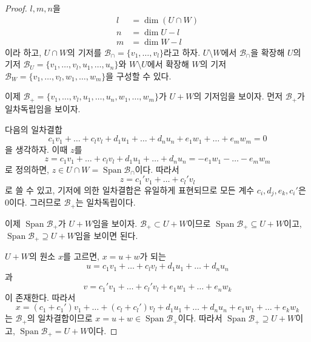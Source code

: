 \documentclass[unfonts,oneside,a4paper]{oblivoir}
\theoremstyle{definition}
\theoremstyle{theorem}
\theoremstyle{theorem}
\theoremstyle{remark}
\theoremstyle{remark}
\theoremstyle{remark}
\theoremstyle{remark}
\renewcommand{\vec}[1]{\bm{\mathit{#1}}}
\newcommand{\vecz}{\bm{\mathrm{0}}}
\DeclareMathOperator{\Span}{Span}
\begin{document}
\begin{proof}
    $l, m, n$을
    \begin{align*}
        l &= \dim (U \cap W)\\
        n &= \dim U - l\\
        m &= \dim W - l
    \end{align*}
    이라 하고, $U \cap W$의 기저를 $\mathcal B_\cap = \{\vec v_1, \dots, \vec v_l\}$라고 하자.
    $U \setminus W$에서 $\mathcal B_\cap$을 확장해 $U$의 기저 $\mathcal B_U = \{\vec v_1, \dots, \vec v_l, \vec u_1, \dots, \vec u_n\}$와 $W \setminus U$에서 확장해 $W$의 기저 $\mathcal B_W = \{\vec v_1, \dots, \vec v_l, \vec w_1, \dots, \vec w_m\}$을 구성할 수 있다.

    이제 $\mathcal B_+ = \{\vec v_1, \dots, \vec v_l, \vec u_1, \dots, \vec u_n, \vec w_1, \dots, \vec w_m\}$가 $U + W$의 기저임을 보이자.
    먼저 $\mathcal B_+$가 일차독립임을 보이자.
    
    다음의 일차결합
    \begin{equation*}
        c_1 \vec v_1 + \dots + c_l \vec v_l + d_1 \vec u_1 + \dots + d_n \vec u_n + e_1 \vec w_1 + \dots + e_m \vec w_m = \vecz
    \end{equation*}
    을 생각하자.
    이때 $\vec z$를
    \begin{equation*}
        \vec z = c_1 \vec v_1 + \dots + c_l \vec v_l + d_1 \vec u_1 + \dots + d_n \vec u_n = - e_1 \vec w_1 - \dots - e_m \vec w_m
    \end{equation*}
    로 정의하면, $\vec z \in U \cap W = \Span \mathcal B_\cap$이다.
    따라서
    \begin{equation*}
        \vec z = c_1' \vec v_1 + \dots + c_l' \vec v_l
    \end{equation*}
    로 쓸 수 있고, 기저에 의한 일차결합은 유일하게 표현되므로 모든 계수 $c_i, d_j, e_k, c_i'$은 0이다.
    그러므로 $\mathcal B_+$는 일차독립이다.
    
    이제 $\Span \mathcal B_+$가 $U + W$임을 보이자.
    $\mathcal B_+ \subset U + W$이므로 $\Span \mathcal B_+ \subseteq U + W$이고, $\Span \mathcal B_+ \supseteq U + W$임을 보이면 된다.
    
    $U + W$의 원소 $\vec x$를 고르면, $\vec x = \vec u + \vec w$가 되는
    \begin{equation*}
        \vec u = c_1 \vec v_1 + \dots + c_l \vec v_l + d_1 \vec u_1 + \dots + d_n \vec u_n
    \end{equation*}
    과
    \begin{equation*}
        \vec v = c_1' \vec v_1 + \dots + c_l' \vec v_l + e_1 \vec w_1 + \dots + e_n \vec w_k
    \end{equation*}
    이 존재한다.
    따라서
    \begin{equation*}
        \vec x = (c_1 + c_1') \vec v_1 + \dots + (c_l + c_l') \vec v_l + d_1 \vec u_1 + \dots + d_n \vec u_n + e_1 \vec w_1 + \dots + e_k \vec w_k
    \end{equation*}
    는 $\mathcal B_+$의 일차결합이므로 $\vec x = \vec u + \vec w \in \Span \mathcal B_+$이다.
    따라서 $\Span \mathcal B_+ \supseteq U + W$이고, $\Span \mathcal B_+ = U + W$이다.


\end{proof}
\end{document}
